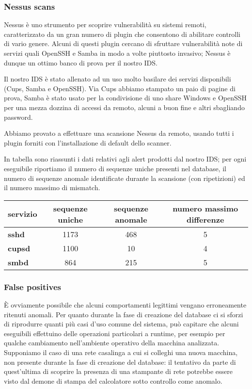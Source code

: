 \documentclass[11pt]{article}
\begin{document}
\subsubsection{Nessus scans}
Nessus è uno strumento per scoprire vulnerabilità su sistemi remoti,
caratterizzato da un gran numero di plugin che consentono di abilitare
controlli di vario genere. Alcuni di questi plugin cercano di sfruttare
vulnerabilità note di servizi quali OpenSSH e Samba in modo a volte piuttosto
invasivo; Nessus è dunque un ottimo banco di prova per il nostro IDS.

Il nostro IDS è stato allenato ad un uso molto basilare dei servizi disponibili
(Cups, Samba e OpenSSH). Via Cups abbiamo stampato un paio di pagine di prova,
Samba è stato usato per la condivisione di uno share Windows e OpenSSH per una
mezza dozzina di accessi da remoto, alcuni a buon fine e altri sbagliando
password.

Abbiamo provato a effettuare una scansione Nessus da remoto, usando tutti i
plugin forniti con l'installazione di default dello scanner.

In tabella sono riassunti i dati relativi agli alert prodotti dal nostro IDS;
per ogni eseguibile riportiamo il numero di sequenze uniche presenti nel
database, il numero di sequenze anomale identificate durante la scansione (con
ripetizioni) ed il numero massimo di mismatch.

\begin{tabular}{l | c | c | c}
servizio      & sequenze uniche & sequenze anomale & numero massimo differenze \\
\hline
\textbf{sshd}          & 1173            & 468                & 5 \\
\textbf{cupsd}         & 1100            & 10                 & 4 \\
\textbf{smbd}          & 864             & 215                & 5 \\
\end{tabular}

\subsubsection{False positives}
È ovviamente possibile che alcuni comportamenti legittimi vengano erroneamente
ritenuti anomali. Per quanto durante la fase di creazione del database ci si
sforzi di riprodurre quanti più casi d'uso comune del sistema, può capitare che
alcuni eseguibili effettuino delle operazioni particolari a runtime, per
esempio per qualche cambiamento nell'ambiente operativo della macchina
analizzata. Supponiamo il caso di una rete casalinga a cui si colleghi una
nuova macchina, non presente durante la fase di creazione del database: il
tentativo da parte di quest'ultima di scoprire la presenza di una stampante di
rete potrebbe essere visto dal demone di stampa del calcolatore sotto controllo
come anomalo.
\end{document}
